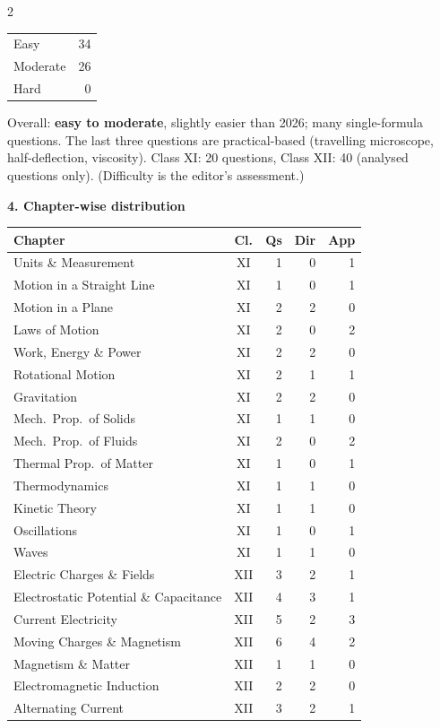 \begin{multicols}{2}
\begin{tabular}{@{}lr@{}}
Easy & 34\\ Moderate & 26\\ Hard & 0\\\bottomrule\end{tabular}\par\smallskip
{\footnotesize Overall: \textbf{easy to moderate}, slightly easier than 2026; many single-formula questions. The last three questions are practical-based (travelling microscope, half-deflection, viscosity). Class XI: 20 questions, Class XII: 40 (analysed questions only). (Difficulty is the editor's assessment.)}\par\medskip
\columnbreak
\textbf{\color{crimson}4. Chapter-wise distribution}\par\smallskip
{\footnotesize\begin{tabular}{@{}p{4.7cm}c@{\,}r@{\,}r@{\,}r@{}}\toprule
Chapter & Cl. & Qs & Dir & App\\\midrule
Units \& Measurement & XI & 1 & 0 & 1\\
Motion in a Straight Line & XI & 1 & 0 & 1\\
Motion in a Plane & XI & 2 & 2 & 0\\
Laws of Motion & XI & 2 & 0 & 2\\
Work, Energy \& Power & XI & 2 & 2 & 0\\
Rotational Motion & XI & 2 & 1 & 1\\
Gravitation & XI & 2 & 2 & 0\\
Mech.\ Prop.\ of Solids & XI & 1 & 1 & 0\\
Mech.\ Prop.\ of Fluids & XI & 2 & 0 & 2\\
Thermal Prop.\ of Matter & XI & 1 & 0 & 1\\
Thermodynamics & XI & 1 & 1 & 0\\
Kinetic Theory & XI & 1 & 1 & 0\\
Oscillations & XI & 1 & 0 & 1\\
Waves & XI & 1 & 1 & 0\\
Electric Charges \& Fields & XII & 3 & 2 & 1\\
Electrostatic Potential \& Capacitance & XII & 4 & 3 & 1\\
Current Electricity & XII & 5 & 2 & 3\\
Moving Charges \& Magnetism & XII & 6 & 4 & 2\\
Magnetism \& Matter & XII & 1 & 1 & 0\\
Electromagnetic Induction & XII & 2 & 2 & 0\\
Alternating Current & XII & 3 & 2 & 1\\

\end{tabular}}
\end{multicols}
